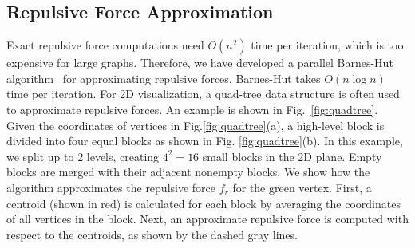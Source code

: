 \documentclass{vgtc}
\begin{document}
\subsection{Repulsive Force Approximation}
Exact repulsive force computations need $O(n^2)$ time per iteration, which is too expensive for large graphs. 
Therefore, we have developed a parallel Barnes-Hut algorithm~\cite{barnes1986hierarchical} for approximating repulsive forces.
Barnes-Hut takes $O(n\log n)$ time per iteration. 
For 2D visualization, a quad-tree data structure is often used to approximate repulsive forces.
An example is shown in Fig.~\ref{fig:quadtree}. 
Given the coordinates of vertices in Fig.\ref{fig:quadtree}(a), a high-level block is divided into four equal blocks as shown in Fig. \ref{fig:quadtree}(b). 
In this example, we split up to $2$ levels, creating $4^2 = 16$ small blocks in the 2D plane. 
Empty blocks are merged with their adjacent nonempty blocks. 
We show how the algorithm approximates the repulsive force $f_r$ for the green vertex.
First, a centroid (shown in red) is calculated for each block by averaging the coordinates of all vertices in the block. 
Next, an approximate repulsive force is computed with respect to the centroids, as shown by the dashed gray lines. 



\end{document}
